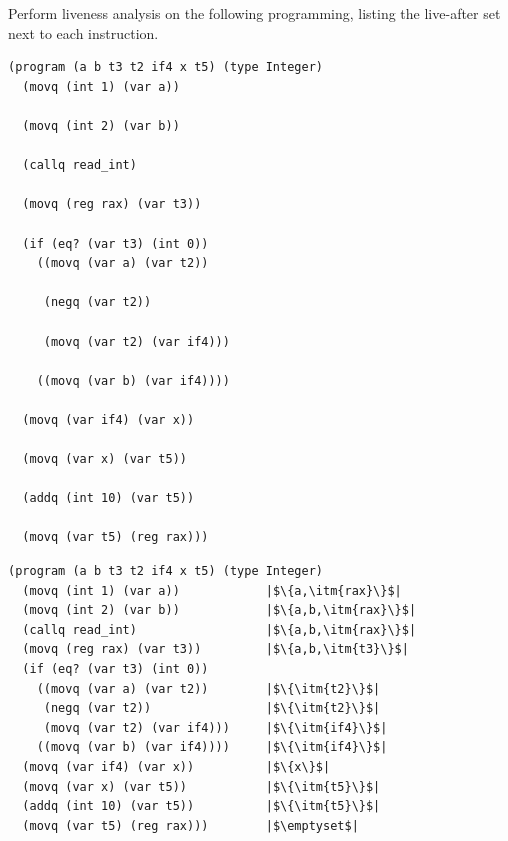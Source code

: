 \documentclass[12pt,answers]{exam}
\newcommand{\itm}[1]{\ensuremath{\mathit{#1}}}
\begin{document}
\begin{questions}

\question[15] Perform liveness analysis on the following programming,
listing the live-after set next to each instruction.

\begin{lstlisting}
(program (a b t3 t2 if4 x t5) (type Integer)
  (movq (int 1) (var a))

  (movq (int 2) (var b))

  (callq read_int)

  (movq (reg rax) (var t3))

  (if (eq? (var t3) (int 0))
    ((movq (var a) (var t2))

     (negq (var t2))

     (movq (var t2) (var if4)))

    ((movq (var b) (var if4))))

  (movq (var if4) (var x))

  (movq (var x) (var t5))

  (addq (int 10) (var t5))

  (movq (var t5) (reg rax)))
\end{lstlisting}

\begin{solution}
\begin{lstlisting}
(program (a b t3 t2 if4 x t5) (type Integer)
  (movq (int 1) (var a))            |$\{a,\itm{rax}\}$|
  (movq (int 2) (var b))            |$\{a,b,\itm{rax}\}$|
  (callq read_int)                  |$\{a,b,\itm{rax}\}$|
  (movq (reg rax) (var t3))         |$\{a,b,\itm{t3}\}$|
  (if (eq? (var t3) (int 0))
    ((movq (var a) (var t2))        |$\{\itm{t2}\}$|
     (negq (var t2))                |$\{\itm{t2}\}$|
     (movq (var t2) (var if4)))     |$\{\itm{if4}\}$|
    ((movq (var b) (var if4))))     |$\{\itm{if4}\}$|
  (movq (var if4) (var x))          |$\{x\}$|
  (movq (var x) (var t5))           |$\{\itm{t5}\}$|
  (addq (int 10) (var t5))          |$\{\itm{t5}\}$|
  (movq (var t5) (reg rax)))        |$\emptyset$|
\end{lstlisting}
\end{solution}


\end{questions}
\end{document}
